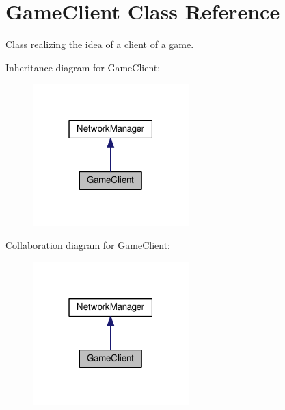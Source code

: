 \hypertarget{classGameClient}{}\section{Game\+Client Class Reference}
\label{classGameClient}


Class realizing the idea of a client of a game.  




Inheritance diagram for Game\+Client\+:
\nopagebreak
\begin{figure}[H]
\begin{center}
\leavevmode
\includegraphics[width=171pt]{classGameClient__inherit__graph}
\end{center}
\end{figure}


Collaboration diagram for Game\+Client\+:
\nopagebreak
\begin{figure}[H]
\begin{center}
\leavevmode
\includegraphics[width=171pt]{classGameClient__coll__graph}
\end{center}
\end{figure}
